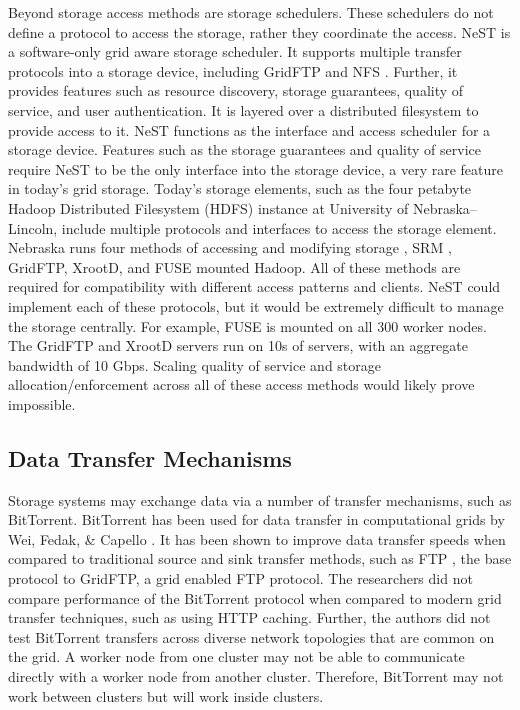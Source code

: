Beyond storage access methods are storage schedulers.  These schedulers do not define a protocol to access the storage, rather they coordinate the access.  NeST \cite{bent2002flexibility} is a software-only grid aware storage scheduler.  It supports multiple transfer protocols into a storage device, including GridFTP \cite{allcock2005globus} and NFS \cite{walsh1985overview}.  Further, it provides features such as resource discovery, storage guarantees, quality of service, and user authentication.  It is layered over a distributed filesystem to provide access to it.  NeST functions as the interface and access scheduler for a storage device.  Features such as the storage guarantees and quality of service require NeST to be the only interface into the storage device, a very rare feature in today's grid storage.  Today's storage elements, such as the four petabyte Hadoop Distributed Filesystem (HDFS) instance at University of Nebraska--Lincoln, include multiple protocols and interfaces to access the storage element.  Nebraska runs four methods of accessing and modifying storage \cite{attebury2009hadoop}, SRM \cite{shoshani2002storage}, GridFTP, XrootD, and FUSE \cite{szeredi2010fuse} mounted Hadoop.  All of these methods are required for compatibility with different access patterns and clients.  NeST could implement each of these protocols, but it would be extremely difficult to manage the storage centrally.  For example, FUSE is mounted on all 300 worker nodes.  The GridFTP and XrootD servers run on 10s of servers, with an aggregate bandwidth of 10 Gbps.  Scaling quality of service and storage allocation/enforcement across all of these access methods would likely prove impossible.

\subsection{Data Transfer Mechanisms}

Storage systems may exchange data via a number of transfer mechanisms, such as BitTorrent.  BitTorrent has been used for data transfer in computational grids by Wei, Fedak, \& Capello \cite{wei2005collaborative, wei2005scheduling, wei2007towards}.  It has been shown to improve data transfer speeds when compared to traditional source and sink transfer methods, such as FTP \cite{postel1985file}, the base protocol to GridFTP, a grid enabled FTP protocol.  The researchers did not compare performance of the BitTorrent protocol when compared to modern grid transfer techniques, such as using HTTP caching.  Further, the authors did not test BitTorrent transfers across diverse network topologies that are common on the grid.  A worker node from one cluster may not be able to communicate directly with a worker node from another cluster.  Therefore, BitTorrent may not work between clusters but will work inside clusters.

